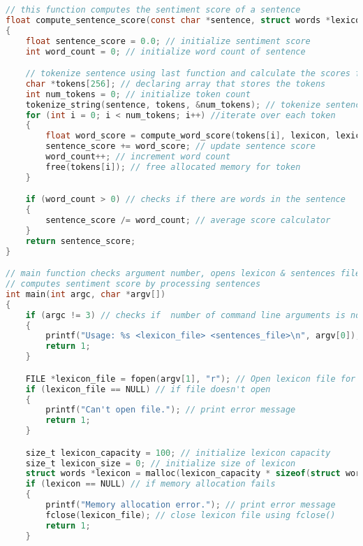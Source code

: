\documentclass{report}
\begin{document}
\begin{lstlisting}[language=C]
// this function computes the sentiment score of a sentence 
float compute_sentence_score(const char *sentence, struct words *lexicon, size_t lexicon_size) 
{
    float sentence_score = 0.0; // initialize sentiment score
    int word_count = 0; // initialize word count of sentence

    // tokenize sentence using last function and calculate the scores for each word
    char *tokens[256]; // declaring array that stores the tokens
    int num_tokens = 0; // initialize token count
    tokenize_string(sentence, tokens, &num_tokens); // tokenize sentence
    for (int i = 0; i < num_tokens; i++) //iterate over each token
    { 
        float word_score = compute_word_score(tokens[i], lexicon, lexicon_size); // compute score for word
        sentence_score += word_score; // update sentence score
        word_count++; // increment word count
        free(tokens[i]); // free allocated memory for token
    }

    if (word_count > 0) // checks if there are words in the sentence
    { 
        sentence_score /= word_count; // average score calculator
    }
    return sentence_score; 
}

// main function checks argument number, opens lexicon & sentences file, reads lexicon into memory, &
// computes sentiment score by processing sentences 
int main(int argc, char *argv[]) 
{
    if (argc != 3) // checks if  number of command line arguments is not 3
    { 
        printf("Usage: %s <lexicon_file> <sentences_file>\n", argv[0]); // print usage message
        return 1; 
    }

    FILE *lexicon_file = fopen(argv[1], "r"); // Open lexicon file for reading; fopen() opens files
    if (lexicon_file == NULL) // if file doesn't open
    { 
        printf("Can't open file."); // print error message
        return 1; 
    }

    size_t lexicon_capacity = 100; // initialize lexicon capacity
    size_t lexicon_size = 0; // initialize size of lexicon
    struct words *lexicon = malloc(lexicon_capacity * sizeof(struct words)); // allocate memory for lexicon
    if (lexicon == NULL) // if memory allocation fails
    { 
        printf("Memory allocation error."); // print error message
        fclose(lexicon_file); // close lexicon file using fclose()
        return 1; 
    }


\end{lstlisting}
\end{document}
